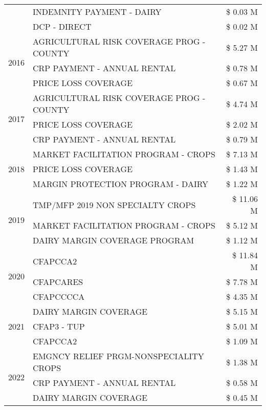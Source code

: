 \begin{tabular}{llr}
 & INDEMNITY PAYMENT - DAIRY & \$ 0.03 M \\
 & DCP - DIRECT & \$ 0.02 M \\
\cline{1-3}
\multirow[t]{3}{*}{2016} & AGRICULTURAL RISK COVERAGE PROG - COUNTY & \$ 5.27 M \\
 & CRP PAYMENT - ANNUAL RENTAL & \$ 0.78 M \\
 & PRICE LOSS COVERAGE & \$ 0.67 M \\
\cline{1-3}
\multirow[t]{3}{*}{2017} & AGRICULTURAL RISK COVERAGE PROG - COUNTY & \$ 4.74 M \\
 & PRICE LOSS COVERAGE & \$ 2.02 M \\
 & CRP PAYMENT - ANNUAL RENTAL & \$ 0.79 M \\
\cline{1-3}
\multirow[t]{3}{*}{2018} & MARKET FACILITATION PROGRAM - CROPS & \$ 7.13 M \\
 & PRICE LOSS COVERAGE & \$ 1.43 M \\
 & MARGIN PROTECTION PROGRAM - DAIRY & \$ 1.22 M \\
\cline{1-3}
\multirow[t]{3}{*}{2019} & TMP/MFP 2019 NON SPECIALTY CROPS & \$ 11.06 M \\
 & MARKET FACILITATION PROGRAM - CROPS & \$ 5.12 M \\
 & DAIRY MARGIN COVERAGE PROGRAM & \$ 1.12 M \\
\cline{1-3}
\multirow[t]{3}{*}{2020} & CFAPCCA2 & \$ 11.84 M \\
 & CFAPCARES & \$ 7.78 M \\
 & CFAPCCCCA & \$ 4.35 M \\
\cline{1-3}
\multirow[t]{3}{*}{2021} & DAIRY MARGIN COVERAGE & \$ 5.15 M \\
 & CFAP3 - TUP & \$ 5.01 M \\
 & CFAPCCA2 & \$ 1.09 M \\
\cline{1-3}
\multirow[t]{3}{*}{2022} & EMGNCY RELIEF PRGM-NONSPECIALITY CROPS & \$ 1.38 M \\
 & CRP PAYMENT - ANNUAL RENTAL & \$ 0.58 M \\
 & DAIRY MARGIN COVERAGE & \$ 0.45 M \\
\cline{1-3}
\bottomrule
\end{tabular}
